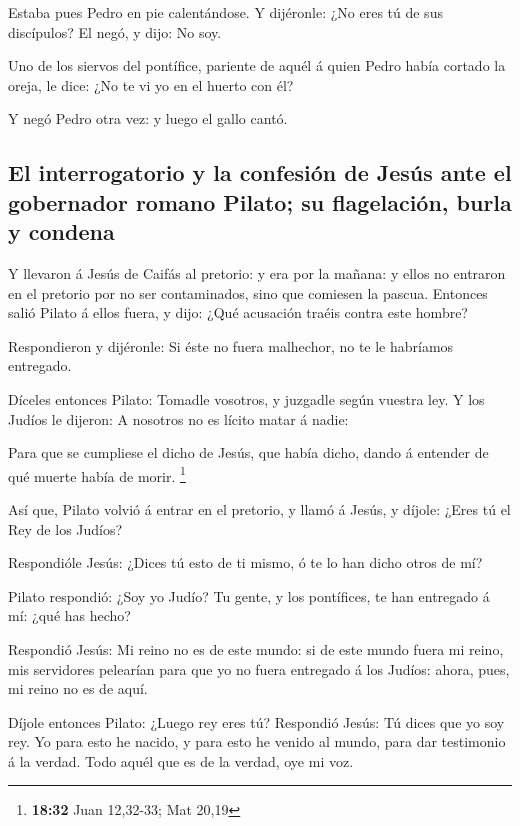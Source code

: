  Estaba pues Pedro en pie calentándose. Y dijéronle: ¿No
eres tú de sus discípulos? El negó, y dijo: No soy.

 Uno de los siervos del pontífice, pariente de aquél á
quien Pedro había cortado la oreja, le dice: ¿No te vi yo en el huerto
con él?

 Y negó Pedro otra vez: y luego el gallo cantó.

\hypertarget{el-interrogatorio-y-la-confesiuxf3n-de-jesuxfas-ante-el-gobernador-romano-pilato-su-flagelaciuxf3n-burla-y-condena}{%
\subsection{El interrogatorio y la confesión de Jesús ante el gobernador
romano Pilato; su flagelación, burla y
condena}\label{el-interrogatorio-y-la-confesiuxf3n-de-jesuxfas-ante-el-gobernador-romano-pilato-su-flagelaciuxf3n-burla-y-condena}}

 Y llevaron á Jesús de Caifás al pretorio: y era por la
mañana: y ellos no entraron en el pretorio por no ser contaminados, sino
que comiesen la pascua.  Entonces salió Pilato á ellos
fuera, y dijo: ¿Qué acusación traéis contra este hombre?

 Respondieron y dijéronle: Si éste no fuera malhechor, no
te le habríamos entregado.

 Díceles entonces Pilato: Tomadle vosotros, y juzgadle
según vuestra ley. Y los Judíos le dijeron: A nosotros no es lícito
matar á nadie:

 Para que se cumpliese el dicho de Jesús, que había dicho,
dando á entender de qué muerte había de morir. \footnote{\textbf{18:32}
  Juan 12,32-33; Mat 20,19}

 Así que, Pilato volvió á entrar en el pretorio, y llamó á
Jesús, y díjole: ¿Eres tú el Rey de los Judíos?

 Respondióle Jesús: ¿Dices tú esto de ti mismo, ó te lo han
dicho otros de mí?

 Pilato respondió: ¿Soy yo Judío? Tu gente, y los
pontífices, te han entregado á mí: ¿qué has hecho?

 Respondió Jesús: Mi reino no es de este mundo: si de este
mundo fuera mi reino, mis servidores pelearían para que yo no fuera
entregado á los Judíos: ahora, pues, mi reino no es de aquí.

 Díjole entonces Pilato: ¿Luego rey eres tú? Respondió
Jesús: Tú dices que yo soy rey. Yo para esto he nacido, y para esto he
venido al mundo, para dar testimonio á la verdad. Todo aquél que es de
la verdad, oye mi voz.

